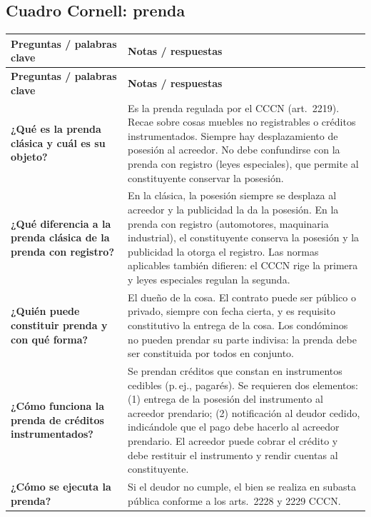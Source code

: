 \documentclass[12pt,oneside]{book}
\begin{document}
\subsection*{Cuadro Cornell: prenda}

\begin{longtable}{p{}p{}}
\toprule
\textbf{Preguntas / palabras clave} & \textbf{Notas / respuestas} \\
\midrule
\endfirsthead
\toprule
\textbf{Preguntas / palabras clave} & \textbf{Notas / respuestas} \\
\midrule
\endhead

\textbf{¿Qué es la prenda clásica y cuál es su objeto?} &
Es la prenda regulada por el CCCN (art.\ 2219). Recae sobre cosas muebles no registrables o créditos instrumentados. Siempre hay desplazamiento de posesión al acreedor. No debe confundirse con la prenda con registro (leyes especiales), que permite al constituyente conservar la posesión. \\[0.6em]

\textbf{¿Qué diferencia a la prenda clásica de la prenda con registro?} &
En la clásica, la posesión siempre se desplaza al acreedor y la publicidad la da la posesión. En la prenda con registro (automotores, maquinaria industrial), el constituyente conserva la posesión y la publicidad la otorga el registro. Las normas aplicables también difieren: el CCCN rige la primera y leyes especiales regulan la segunda. \\[0.6em]

\textbf{¿Quién puede constituir prenda y con qué forma?} &
El dueño de la cosa. El contrato puede ser público o privado, siempre con fecha cierta, y es requisito constitutivo la entrega de la cosa. Los condóminos no pueden prendar su parte indivisa: la prenda debe ser constituida por todos en conjunto. \\[0.6em]

\textbf{¿Cómo funciona la prenda de créditos instrumentados?} &
Se prendan créditos que constan en instrumentos cedibles (p.\,ej., pagarés). Se requieren dos elementos: (1) entrega de la posesión del instrumento al acreedor prendario; (2) notificación al deudor cedido, indicándole que el pago debe hacerlo al acreedor prendario. El acreedor puede cobrar el crédito y debe restituir el instrumento y rendir cuentas al constituyente. \\[0.6em]

\textbf{¿Cómo se ejecuta la prenda?} &
Si el deudor no cumple, el bien se realiza en subasta pública conforme a los arts.\ 2228 y 2229 CCCN. \\[0.6em]


\end{longtable}
\end{document}
